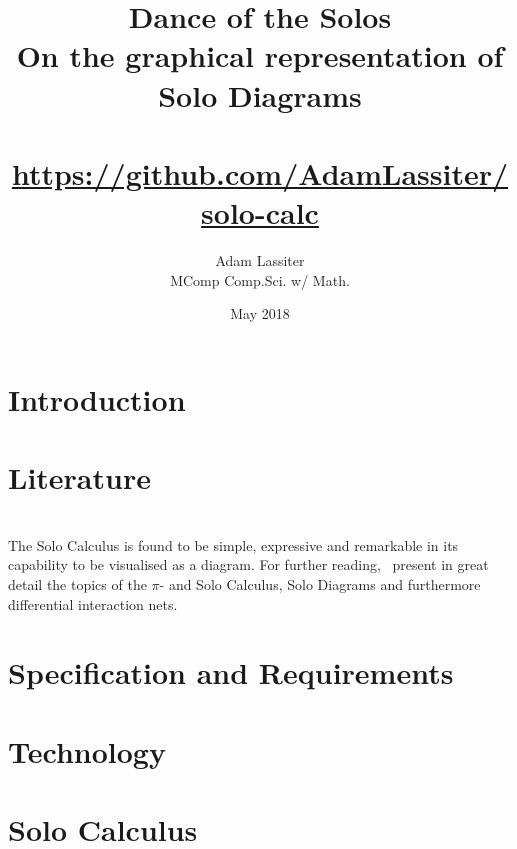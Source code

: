 \documentclass[twoside]{article}
\title{Dance of the Solos \\
    \large On the graphical representation of Solo Diagrams \\~\\
    \small \url{https://github.com/AdamLassiter/solo-calc}}
\author{Adam Lassiter \\
    \small MComp Comp.Sci. w/ Math.}
\date{May 2018}
\begin{document}
    
    
    \pagebreak

    
    \pagebreak

    
    \pagebreak

    

    
    \pagebreak

    \tableofcontents
    \pagebreak

    \section{Introduction}
        

    \section{Literature}
        
        
        
        
        
        
        ~\\ %
        The Solo Calculus is found to be simple, expressive and remarkable in its capability to be visualised as a diagram.
        For further reading,~\cite{acyclic-solos} present in great detail the topics of the $\pi$- and Solo Calculus, Solo Diagrams and furthermore differential interaction nets.

    \section{Specification and Requirements}
        
        

    \section{Technology}

    \section{Solo Calculus}
        
        
\end{document}
